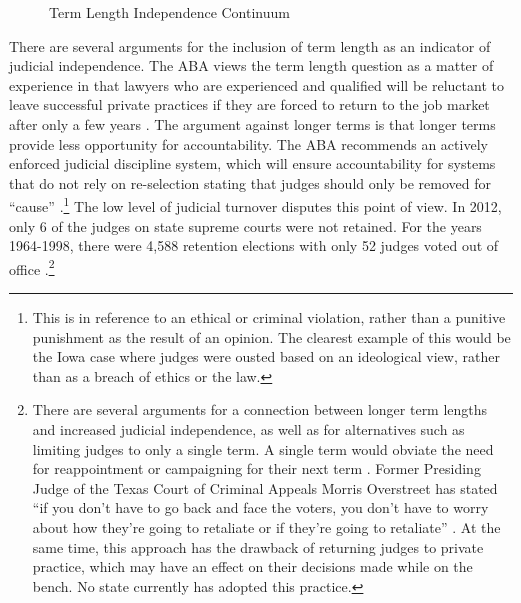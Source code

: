 \documentclass[12pt]{article}
\begin{document}
\begin{figure}[tbh]\centering\caption{Term Length Independence Continuum}\label{termcontinuum}
\end{figure}

There are several arguments for the inclusion of term length as an indicator of judicial independence. The ABA views the term length question as a matter of experience in that lawyers who are experienced and qualified will be reluctant to leave successful private practices if they are forced to return to the job market after only a few years \citep[97]{ABA2003}.   The argument against longer terms is that longer terms provide less opportunity for accountability. The ABA recommends an actively enforced judicial discipline system, which will ensure accountability for systems that do not rely on re-selection stating that judges should only be removed for ``cause'' \citep[103]{ABA2003}.\footnote{This is in reference to an ethical or criminal violation, rather than a punitive punishment as the result of an opinion.  The clearest example of this would be the Iowa case where judges were ousted based on an ideological view, rather than as a breach of ethics or the law.}  The low level of judicial turnover disputes this point of view. In 2012, only 6 of the judges on state supreme courts were not retained. For the years 1964-1998, there were 4,588 retention elections with only 52 judges voted out of office \citep{Aspin2000}.\footnote{There are several arguments for a connection between longer term lengths and increased judicial independence, as well as for alternatives such as limiting judges to only a single term. A single term would obviate the need for reappointment or campaigning for their next term \citep{Carrington1998}.  Former Presiding Judge of the Texas Court of Criminal Appeals Morris Overstreet has stated ``if you don't have to go back and face the voters, you don't have to worry about how they're going to retaliate or if they're going to retaliate'' \citep{ABA2003}.  At the same time, this approach has the drawback of returning judges to private practice, which may have an effect on their decisions made while on the bench.  No state currently has adopted this practice.}
\end{document}
